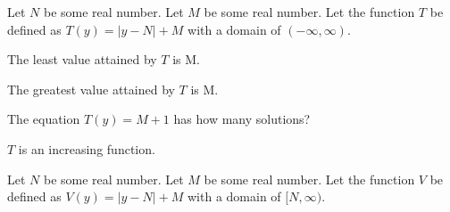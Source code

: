 \documentclass{ximera}
\begin{document}
\begin{definition}
Let $N$ be some real number.
Let $M$ be some real number.
Let the function $T$ be defined as $T(y) = |y-N|+M$ with a domain of $(-\infty, \infty)$. 

\end{definition}


\begin{exercise}
The least value attained by $T$ is M.

\begin{multipleChoice}
\end{multipleChoice}

\end{exercise}



\begin{exercise}
The greatest value attained by $T$ is M.

\begin{multipleChoice}
\end{multipleChoice}

\end{exercise}







\begin{exercise}
The equation $T(y) = M+1$ has how many solutions?

\begin{selectAll}
\end{selectAll}

\end{exercise}



\begin{exercise}
$T$ is an increasing function.

\begin{multipleChoice}
\end{multipleChoice}

\end{exercise}












\begin{definition}
Let $N$ be some real number.
Let $M$ be some real number.
Let the function $V$ be defined as $V(y) = |y-N|+M$ with a domain of $[N, \infty)$. 

\end{definition}
\end{document}
